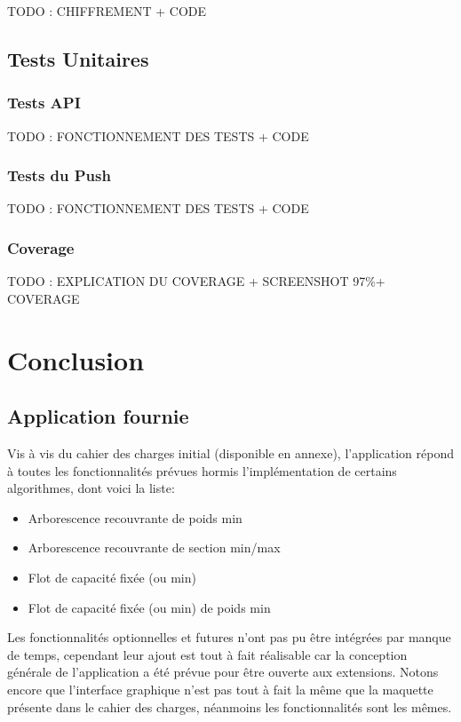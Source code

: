 \documentclass[french]{article}
\begin{document}
	TODO : CHIFFREMENT + CODE
	
	\subsection{Tests Unitaires}
	\subsubsection{Tests API}
	
	TODO : FONCTIONNEMENT DES TESTS + CODE
	
	\subsubsection{Tests du Push}
	
	TODO : FONCTIONNEMENT DES TESTS + CODE
	
	\subsubsection{Coverage}
	
	TODO : EXPLICATION DU COVERAGE + SCREENSHOT 97\%+ COVERAGE
	
		\section{Conclusion}
		
		\subsection{Application fournie}			
		Vis à vis du cahier des charges initial (disponible en annexe), l'application répond à toutes les fonctionnalités prévues hormis l'implémentation de certains algorithmes, dont voici la liste:
		\begin{itemize}
			\item Arborescence recouvrante de poids min
			\item Arborescence recouvrante de section min/max
			\item Flot de capacité fixée (ou min)
			\item Flot de capacité fixée (ou min) de poids min
		\end{itemize}
		Les fonctionnalités optionnelles et futures n'ont pas pu être intégrées par manque de temps, cependant leur ajout est tout à fait réalisable car la conception générale de l'application a été prévue pour être ouverte aux extensions. Notons encore que l'interface graphique n'est pas tout à fait la même que la maquette présente dans le cahier des charges, néanmoins les fonctionnalités sont les mêmes.\\
		
\end{document}
